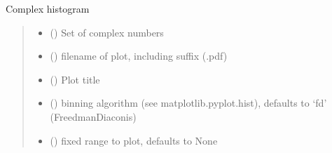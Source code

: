 \documentclass[letterpaper,10pt,english]{sphinxmanual}
\begin{document}
\begin{fulllineitems}
\label{\detokenize{spinbox:spinbox.extras.chistogram}}
\pysigstartsignatures
{}
\pysigstopsignatures
\sphinxAtStartPar
Complex histogram
\begin{quote}\begin{description}
\begin{itemize}
\item {} 
\sphinxAtStartPar
{} () \textendash{} Set of complex numbers

\item {} 
\sphinxAtStartPar
{} () \textendash{} filename of plot, including suffix (.pdf)

\item {} 
\sphinxAtStartPar
{} () \textendash{} Plot title

\item {} 
\sphinxAtStartPar
{} (\sphinxstyleliteralemphasis{\sphinxupquote{, }}) \textendash{} binning algorithm (see matplotlib.pyplot.hist), defaults to ‘fd’ (Freedman\sphinxhyphen{}Diaconis)

\item {} 
\sphinxAtStartPar
{} (\sphinxstyleliteralemphasis{\sphinxupquote{, }}) \textendash{} fixed range to plot, defaults to None

\end{itemize}

\end{description}\end{quote}

\end{fulllineitems}
\end{document}

